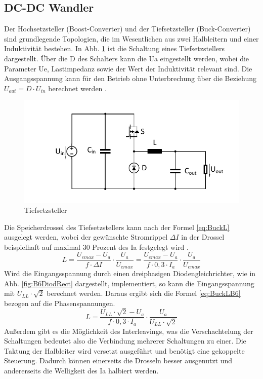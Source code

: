 		\subsection{DC-DC Wandler} \label{sec:Buck}
		Der Hochsetzsteller (Boost-Converter) und der Tiefsetzsteller (Buck-Converter) sind grundlegende Topologien, die im Wesentlichen aus zwei Halbleitern und einer Induktivität bestehen. In Abb. \ref{fig:buck} ist die Schaltung eines Tiefsetzstellers dargestellt. Über die \gls{D} des Schalters kann die \gls{Ua} eingestellt werden, wobei die Parameter \gls{Ue}, Lastimpedanz sowie der Wert der Induktivität relevant sind. Die Ausgangsspannung kann für den Betrieb ohne Unterbrechung über die Beziehung $U_{out}=D\cdot U_{in} $ berechnet werden \cite{schmidtwalter}.
		\begin{figure}
			\centering
			\includegraphics[width=0.9\linewidth]{content/Grafiken/Buck}
			\caption[Tiefsetzsteller]{Tiefsetzsteller}
			\label{fig:buck}
		\end{figure}
		Die Speicherdrossel des Tiefsetzstellers kann nach der Formel \ref{eq:BuckL} ausgelegt werden, wobei der gewünschte Stromrippel $\Delta I $ in der Drossel beispielhaft auf maximal 30 Prozent des \gls{Ia} festgelegt wird \cite{schmidtwalter}.
		\begin{equation}
			\label{eq:BuckL}
			L=\dfrac{U_{emax}-U_{a}}{f\cdot \Delta I}\cdot \dfrac{U_{a}}{U_{emax}} = \dfrac{U_{emax}-U_{a}}{f\cdot 0,3 \cdot I_{a}}\cdot \dfrac{U_{a}}{U_{emax}}
		\end{equation}
		Wird die Eingangsspannung durch einen dreiphasigen Diodengleichrichter, wie in Abb. \ref{fig:B6DiodRect} dargestellt,  implementiert, so kann die Eingangsspannung mit $U_{LL} \cdot \sqrt{2}$ berechnet werden. Daraus ergibt sich die Formel \ref{eq:BuckLB6} bezogen auf die Phasenspannungen. \\
		\begin{equation}
			\label{eq:BuckLB6}
			L=\dfrac{U_{LL} \cdot \sqrt{2}-U_{a}}{f\cdot 0,3 \cdot I_{a}}\cdot \dfrac{U_{a}}{U_{LL} \cdot \sqrt{2}}
		\end{equation}
		Außerdem gibt es die Möglichkeit des Interleavings, was die Verschachtelung der Schaltungen bedeutet also die Verbindung mehrerer Schaltungen zu einer. Die Taktung der Halbleiter wird versetzt ausgeführt und benötigt eine gekoppelte Steuerung. Dadurch können einerseits die Drosseln besser ausgenutzt und andererseits die Welligkeit des \gls{Ia} halbiert werden. 
		
